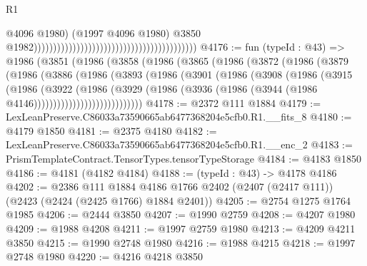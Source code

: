 \begin{lexlean}{R1}
\begin{coremodule}
                                                                                          @4096
                                                                                          @1980)
                                                                                        (@1997
                                                                                          @4096
                                                                                          @1980)
                                                                                        @3850
                                                                                        @1982))))))))))))))))))))))))))))))))))))))))))
@4176 := fun (typeId : @43) =>
  @1986
    (@3851
      (@1986
        (@3858
          (@1986
            (@3865
              (@1986
                (@3872
                  (@1986
                    (@3879
                      (@1986
                        (@3886
                          (@1986
                            (@3893
                              (@1986
                                (@3901
                                  (@1986
                                    (@3908
                                      (@1986
                                        (@3915
                                          (@1986
                                            (@3922
                                              (@1986
                                                (@3929
                                                  (@1986
                                                    (@3936
                                                      (@1986
                                                        (@3944
                                                          (@1986 @4146))))))))))))))))))))))))))))
@4178 := @2372 @111 @1884
@4179 := LexLeanPreserve.C86033a73590665ab6477368204e5cfb0.R1.__fits_8
@4180 := @4179 @1850
@4181 := @2375 @4180
@4182 := LexLeanPreserve.C86033a73590665ab6477368204e5cfb0.R1.__enc_2
@4183 := PrismTemplateContract.TensorTypes.tensorTypeStorage
@4184 := @4183 @1850
@4186 := @4181 (@4182 @4184)
@4188 := (typeId : @43) -> @4178 @4186
@4202 := @2386
    @111
    @1884
    @4186
    @1766
    @2402
    (@2407 (@2417 @111))
    (@2423 (@2424 (@2425 @1766) @1884 @2401))
@4205 := @2754 @1275 @1764 @1985
@4206 := @2444 @3850
@4207 := @1990 @2759
@4208 := @4207 @1980
@4209 := @1988 @4208
@4211 := @1997 @2759 @1980
@4213 := @4209 @4211 @3850
@4215 := @1990 @2748 @1980
@4216 := @1988 @4215
@4218 := @1997 @2748 @1980
@4220 := @4216 @4218 @3850

\end{coremodule}
\end{lexlean}
